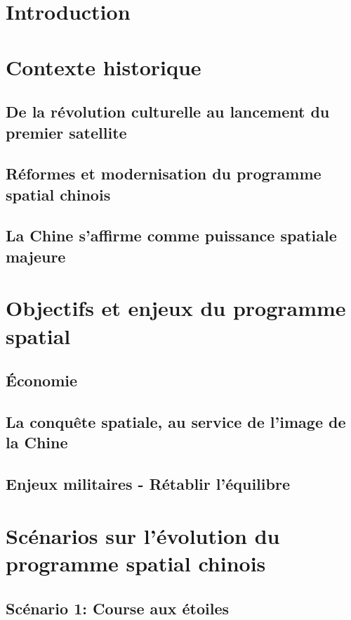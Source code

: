 \section{Introduction}

\section{Contexte historique}

\subsection{De la révolution culturelle au lancement du premier satellite}

\subsection{Réformes et modernisation du programme spatial chinois}

\subsection{La Chine s'affirme comme puissance spatiale majeure}

\section{Objectifs et enjeux du programme spatial}

\subsection{Économie}

\subsection{La conquête spatiale, au service de l'image de la Chine}

\subsection{Enjeux militaires - Rétablir l'équilibre}

\section{Scénarios sur l'évolution du programme spatial chinois}

\subsection{Scénario 1: Course aux étoiles}

